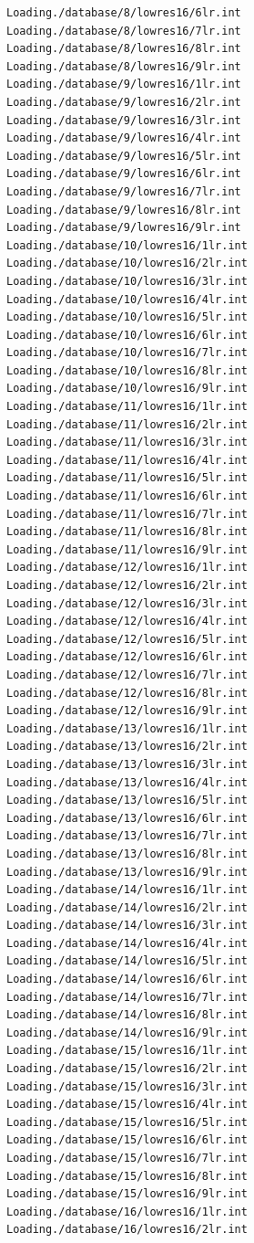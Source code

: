 \documentclass[a4paper,11pt,titlepage]{article}
\begin{document}
\begin{verbatim}
Loading./database/8/lowres16/6lr.int
Loading./database/8/lowres16/7lr.int
Loading./database/8/lowres16/8lr.int
Loading./database/8/lowres16/9lr.int
Loading./database/9/lowres16/1lr.int
Loading./database/9/lowres16/2lr.int
Loading./database/9/lowres16/3lr.int
Loading./database/9/lowres16/4lr.int
Loading./database/9/lowres16/5lr.int
Loading./database/9/lowres16/6lr.int
Loading./database/9/lowres16/7lr.int
Loading./database/9/lowres16/8lr.int
Loading./database/9/lowres16/9lr.int
Loading./database/10/lowres16/1lr.int
Loading./database/10/lowres16/2lr.int
Loading./database/10/lowres16/3lr.int
Loading./database/10/lowres16/4lr.int
Loading./database/10/lowres16/5lr.int
Loading./database/10/lowres16/6lr.int
Loading./database/10/lowres16/7lr.int
Loading./database/10/lowres16/8lr.int
Loading./database/10/lowres16/9lr.int
Loading./database/11/lowres16/1lr.int
Loading./database/11/lowres16/2lr.int
Loading./database/11/lowres16/3lr.int
Loading./database/11/lowres16/4lr.int
Loading./database/11/lowres16/5lr.int
Loading./database/11/lowres16/6lr.int
Loading./database/11/lowres16/7lr.int
Loading./database/11/lowres16/8lr.int
Loading./database/11/lowres16/9lr.int
Loading./database/12/lowres16/1lr.int
Loading./database/12/lowres16/2lr.int
Loading./database/12/lowres16/3lr.int
Loading./database/12/lowres16/4lr.int
Loading./database/12/lowres16/5lr.int
Loading./database/12/lowres16/6lr.int
Loading./database/12/lowres16/7lr.int
Loading./database/12/lowres16/8lr.int
Loading./database/12/lowres16/9lr.int
Loading./database/13/lowres16/1lr.int
Loading./database/13/lowres16/2lr.int
Loading./database/13/lowres16/3lr.int
Loading./database/13/lowres16/4lr.int
Loading./database/13/lowres16/5lr.int
Loading./database/13/lowres16/6lr.int
Loading./database/13/lowres16/7lr.int
Loading./database/13/lowres16/8lr.int
Loading./database/13/lowres16/9lr.int
Loading./database/14/lowres16/1lr.int
Loading./database/14/lowres16/2lr.int
Loading./database/14/lowres16/3lr.int
Loading./database/14/lowres16/4lr.int
Loading./database/14/lowres16/5lr.int
Loading./database/14/lowres16/6lr.int
Loading./database/14/lowres16/7lr.int
Loading./database/14/lowres16/8lr.int
Loading./database/14/lowres16/9lr.int
Loading./database/15/lowres16/1lr.int
Loading./database/15/lowres16/2lr.int
Loading./database/15/lowres16/3lr.int
Loading./database/15/lowres16/4lr.int
Loading./database/15/lowres16/5lr.int
Loading./database/15/lowres16/6lr.int
Loading./database/15/lowres16/7lr.int
Loading./database/15/lowres16/8lr.int
Loading./database/15/lowres16/9lr.int
Loading./database/16/lowres16/1lr.int
Loading./database/16/lowres16/2lr.int

\end{verbatim}
\end{document}
